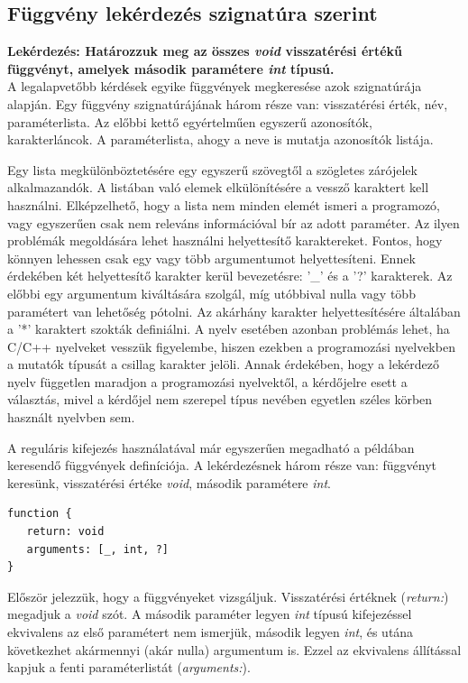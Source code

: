 \documentclass[a4paper,12pt]{report}
\begin{document}
\subsection{Függvény lekérdezés szignatúra szerint}
\textbf{Lekérdezés: Határozzuk meg az összes \textit{void} visszatérési értékű függvényt, amelyek második paramétere \textit{int} típusú.}
\\
A legalapvetőbb kérdések egyike függvények megkeresése azok szignatúrája alapján. Egy függvény szignatúrájának három része van: visszatérési érték, név, paraméterlista. Az előbbi kettő egyértelműen egyszerű azonosítók, karakterláncok. A paraméterlista, ahogy a neve is mutatja azonosítók listája.
\par Egy lista megkülönböztetésére egy egyszerű szövegtől a szögletes zárójelek alkalmazandók. A listában való elemek elkülönítésére a vessző karaktert kell használni. Elképzelhető, hogy a lista nem minden elemét ismeri a programozó, vagy egyszerűen csak nem releváns információval bír az adott paraméter. Az ilyen problémák megoldására lehet használni helyettesítő karaktereket. Fontos, hogy könnyen lehessen csak egy vagy több argumentumot helyettesíteni. Ennek érdekében két helyettesítő karakter kerül bevezetésre: '\_' és a '?' karakterek. Az előbbi egy argumentum kiváltására szolgál, míg utóbbival nulla vagy több paramétert van lehetőség pótolni. Az akárhány karakter helyettesítésére általában a '*' karaktert szokták definiálni. A nyelv esetében azonban problémás lehet, ha C/C++ nyelveket vesszük figyelembe, hiszen ezekben a programozási nyelvekben a mutatók típusát a csillag karakter jelöli. Annak érdekében, hogy a lekérdező nyelv független maradjon a programozási nyelvektől, a kérdőjelre esett a választás, mivel a kérdőjel nem szerepel típus nevében egyetlen széles körben használt nyelvben sem.
\par A reguláris kifejezés használatával már egyszerűen megadható a példában keresendő függvények definíciója. A lekérdezésnek három része van: függvényt keresünk, visszatérési értéke \textit{void}, második paramétere \textit{int}.
\begin{verbatim}
function {
   return: void
   arguments: [_, int, ?]
}
\end{verbatim}
\par Először jelezzük, hogy a függvényeket vizsgáljuk. Visszatérési értéknek (\textit{return:}) megadjuk a \textit{void} szót. A második paraméter legyen \textit{int} típusú kifejezéssel ekvivalens az első paramétert nem ismerjük, második legyen \textit{int}, és utána következhet akármennyi (akár nulla) argumentum is. Ezzel az ekvivalens állítással kapjuk a fenti paraméterlistát (\textit{arguments:}).
\end{document}

